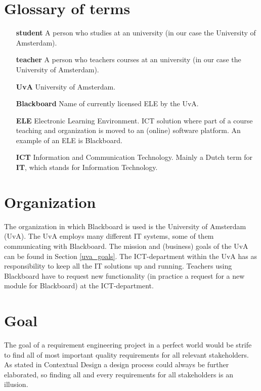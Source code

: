 \section{Glossary of terms}
\begin{itemize}
	\item[\textbf{student}] A person who studies at an university (in our case the University of Amsterdam).
	\item[\textbf{teacher}] A person who teachers courses at an university (in our case the University of Amsterdam).
	\item[\textbf{UvA}] University of Amsterdam. 
	\item[\textbf{Blackboard}] Name of currently licensed ELE by the UvA. 
	\item[\textbf{ELE}] Electronic Learning Environment. ICT solution where part of a course teaching and organization is moved to an (online) software platform. An example of an ELE is Blackboard.
	\item[\textbf{ICT}] Information and Communication Technology. Mainly a Dutch term for \textbf{IT}, which stands for Information Technology.
	
	
\end{itemize}

\section{Organization}
The organization in which Blackboard is used is the University of Amsterdam (UvA). The UvA employs many different IT systems, some of them communicating with Blackboard. The mission and (business) goals of the UvA can be found in Section \ref{uva_goals}. The ICT-department within the UvA has as responsibility to keep all the IT solutions up and running. Teachers using Blackboard have to request new functionality (in practice a request for a new module for Blackboard) at the ICT-department. 


\section{Goal}
The goal of a requirement engineering project in a perfect world would be strife to find all of most important quality requirements for all relevant stakeholders. As stated in Contextual Design \cite{contextual_design} a design process could always be further elaborated, so finding all and every requirements for all stakeholders is an illusion.

